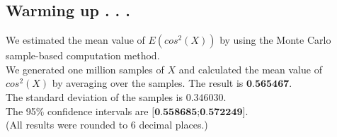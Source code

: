 \subsection{Warming up . . .}
We estimated the mean value of $E(cos^2(X))$ by using the Monte Carlo sample-based computation method.\\
We generated one million samples of $X$ and calculated the mean value of $cos^2(X)$ by averaging over the samples.
The result is $\textbf{0.565467}$.\\
The standard deviation of the samples is $0.346030$.\\
The 95\% confidence intervals are
$\textbf{[0.558685;0.572249]}$.\\
(All results were rounded to 6 decimal places.)
